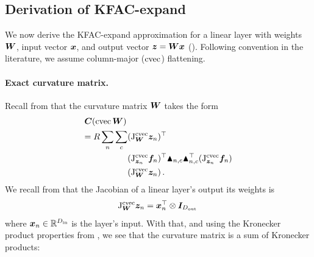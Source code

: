 

\subsection{Derivation of KFAC-expand}

We now derive the KFAC-expand approximation for a linear layer with weights ${\bm{W}}$, input vector ${\bm{x}}$, and output vector ${\bm{z}} = {\bm{W}}{\bm{x}}$ ().
Following convention in the literature, we assume column-major ($\operatorname{cvec}$) flattening.

\paragraph{Exact curvature matrix.}
Recall from  that the curvature matrix \wrt ${\bm{W}}$ takes the form
\begin{align*}
  &{\bm{C}}(\operatorname{cvec} {\bm{W}}) \\
  &\begin{aligned}=
    R \sum_n \sum_c &(\mathrm{J}^{\operatorname{cvec}}_{{\bm{W}}}{\bm{z}}_n)^{\top} \\
                    &(\mathrm{J}^{\operatorname{cvec}}_{{\bm{z}}_n}{\bm{f}}_n)^{\top}
                      \blacktriangle_{n,c} \blacktriangle_{n,c}^{\top}
                      (\mathrm{J}^{\operatorname{cvec}}_{{\bm{z}}_n}{\bm{f}}_n) \\
                    &(\mathrm{J}^{\operatorname{cvec}}_{{\bm{W}}}{\bm{z}}_n)\,.
  \end{aligned}
\end{align*}
We recall from  that the Jacobian of a linear layer's output \wrt its weights is
$$ \mathrm{J}^{\operatorname{cvec}}_{{\bm{W}}}{\bm{z}}_n = {\bm{x}}_n^{\top} \otimes {\bm{I}}_{D_{\text{out}}}\, $$
where ${\bm{x}}_n \in \mathbb{R}^{D_\text{in}}$ is the layer's input.
With that, and using the Kronecker product properties from , we see that the curvature matrix is a sum of Kronecker products:
